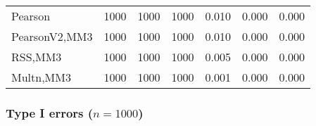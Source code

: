 \documentclass[
]{article}
\begin{document}
\begin{table}[H]
{\begin{tabular}[t]{lrrrrrr}
\hspace{1em}Pearson & 1000 & 1000 & 1000 & 0.010 & 0.000 & 0.000\\
\hspace{1em}PearsonV2,MM3 & 1000 & 1000 & 1000 & 0.010 & 0.000 & 0.000\\
\hspace{1em}RSS,MM3 & 1000 & 1000 & 1000 & 0.005 & 0.000 & 0.000\\
\hspace{1em}Multn,MM3 & 1000 & 1000 & 1000 & 0.001 & 0.000 & 0.000\\
\bottomrule
\end{tabular}}
\end{table}

\hypertarget{type-i-errors-n1000-2}{%
\subsubsection{\texorpdfstring{Type I errors
(\(n=1000\))}{Type I errors (n=1000)}}\label{type-i-errors-n1000-2}}
\end{document}

